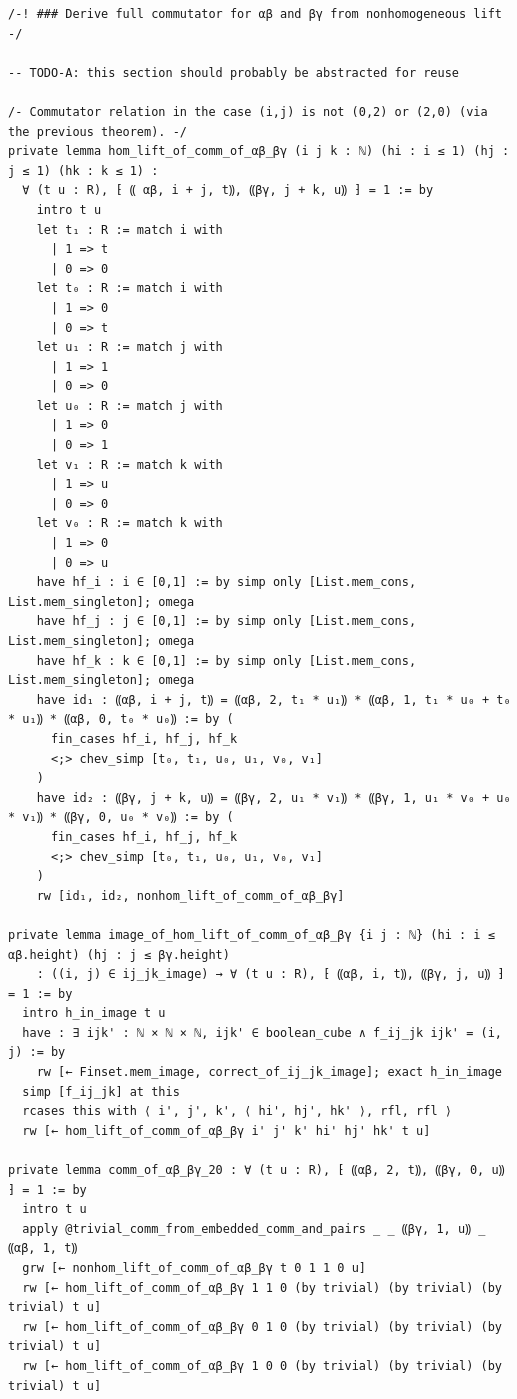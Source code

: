 \begin{Verbatim}
/-! ### Derive full commutator for αβ and βγ from nonhomogeneous lift -/

-- TODO-A: this section should probably be abstracted for reuse

/- Commutator relation in the case (i,j) is not (0,2) or (2,0) (via the previous theorem). -/
private lemma hom_lift_of_comm_of_αβ_βγ (i j k : ℕ) (hi : i ≤ 1) (hj : j ≤ 1) (hk : k ≤ 1) :
  ∀ (t u : R), ⁅ ⸨ αβ, i + j, t⸩, ⸨βγ, j + k, u⸩ ⁆ = 1 := by
    intro t u
    let t₁ : R := match i with
      | 1 => t
      | 0 => 0
    let t₀ : R := match i with
      | 1 => 0
      | 0 => t
    let u₁ : R := match j with
      | 1 => 1
      | 0 => 0
    let u₀ : R := match j with
      | 1 => 0
      | 0 => 1
    let v₁ : R := match k with
      | 1 => u
      | 0 => 0
    let v₀ : R := match k with
      | 1 => 0
      | 0 => u
    have hf_i : i ∈ [0,1] := by simp only [List.mem_cons, List.mem_singleton]; omega
    have hf_j : j ∈ [0,1] := by simp only [List.mem_cons, List.mem_singleton]; omega
    have hf_k : k ∈ [0,1] := by simp only [List.mem_cons, List.mem_singleton]; omega
    have id₁ : ⸨αβ, i + j, t⸩ = ⸨αβ, 2, t₁ * u₁⸩ * ⸨αβ, 1, t₁ * u₀ + t₀ * u₁⸩ * ⸨αβ, 0, t₀ * u₀⸩ := by (
      fin_cases hf_i, hf_j, hf_k
      <;> chev_simp [t₀, t₁, u₀, u₁, v₀, v₁]
    )
    have id₂ : ⸨βγ, j + k, u⸩ = ⸨βγ, 2, u₁ * v₁⸩ * ⸨βγ, 1, u₁ * v₀ + u₀ * v₁⸩ * ⸨βγ, 0, u₀ * v₀⸩ := by (
      fin_cases hf_i, hf_j, hf_k
      <;> chev_simp [t₀, t₁, u₀, u₁, v₀, v₁]
    )
    rw [id₁, id₂, nonhom_lift_of_comm_of_αβ_βγ]

private lemma image_of_hom_lift_of_comm_of_αβ_βγ {i j : ℕ} (hi : i ≤ αβ.height) (hj : j ≤ βγ.height)
    : ((i, j) ∈ ij_jk_image) → ∀ (t u : R), ⁅ ⸨αβ, i, t⸩, ⸨βγ, j, u⸩ ⁆ = 1 := by
  intro h_in_image t u
  have : ∃ ijk' : ℕ × ℕ × ℕ, ijk' ∈ boolean_cube ∧ f_ij_jk ijk' = (i, j) := by
    rw [← Finset.mem_image, correct_of_ij_jk_image]; exact h_in_image
  simp [f_ij_jk] at this
  rcases this with ⟨ i', j', k', ⟨ hi', hj', hk' ⟩, rfl, rfl ⟩
  rw [← hom_lift_of_comm_of_αβ_βγ i' j' k' hi' hj' hk' t u]

private lemma comm_of_αβ_βγ_20 : ∀ (t u : R), ⁅ ⸨αβ, 2, t⸩, ⸨βγ, 0, u⸩ ⁆ = 1 := by
  intro t u
  apply @trivial_comm_from_embedded_comm_and_pairs _ _ ⸨βγ, 1, u⸩ _ ⸨αβ, 1, t⸩
  grw [← nonhom_lift_of_comm_of_αβ_βγ t 0 1 1 0 u]
  rw [← hom_lift_of_comm_of_αβ_βγ 1 1 0 (by trivial) (by trivial) (by trivial) t u]
  rw [← hom_lift_of_comm_of_αβ_βγ 0 1 0 (by trivial) (by trivial) (by trivial) t u]
  rw [← hom_lift_of_comm_of_αβ_βγ 1 0 0 (by trivial) (by trivial) (by trivial) t u]


\end{Verbatim}
